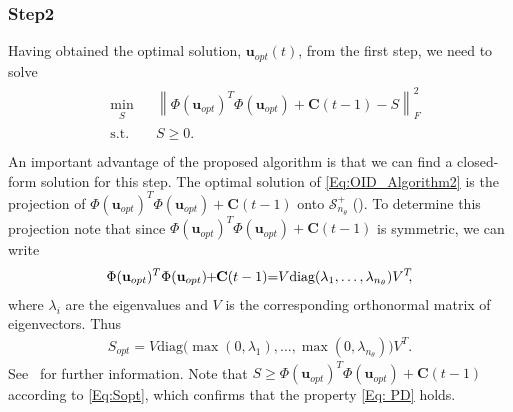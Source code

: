 \documentclass{ifacconf}
\begin{document}
\subsubsection{Step2}\label{Step2}
Having obtained the optimal solution, $\textbf{u}_{opt}(t)$, from the first step, we need to solve
\vspace{-0.2cm}
\begin{eqnarray} \label{Eq:OID_Algorithm2}
\begin{split}
&\min_{\substack {S}}
								&& \left \| \Phi(\textbf{u}_{opt})^T\Phi(\textbf{u}_{opt}) + \textbf{C}(t-1) - S  \right \|_F^2\\
&\text{s.t.}
			      		&& S \geq 0.\\
\end{split}
\end{eqnarray}
An important advantage of the proposed algorithm is that we can find a closed-form solution for this step. The optimal solution of \eqref{Eq:OID_Algorithm2} is the projection of $\Phi(\textbf{u}_{opt})^T\Phi(\textbf{u}_{opt}) + \textbf{C}(t-1)$ onto  $\mathcal{S}^+_{n_\theta}$ (\cite{ProjectionMethodsInConicOptimization2012}). To determine this projection note that since $\Phi(\textbf{u}_{opt})^T\Phi(\textbf{u}_{opt}) + \textbf{C}(t-1)$ is symmetric, we can write
\begin{align}\label{Eq:EigenValueDecomposition}
\Phi(\textbf{u}_{opt})^T\Phi(\textbf{u}_{opt}) \hspace{-0.1cm}+  \hspace{-0.1cm} \textbf{C}(t-1) \hspace{-0.1cm}=\hspace{-0.1cm} V \text{diag} (\lambda_1, \ldots, \lambda_{n_{\theta}}) V^T  \hspace{-0.1cm},
\end{align}
where $\lambda_i$ are the eigenvalues and $V$ is the corresponding orthonormal matrix of eigenvectors. Thus
\begin{align} \label{Eq:Sopt}
S_{opt}= V \text{diag} \big(\max(0,\lambda_1), \ldots, \max(0,\lambda_{n_{\theta}}) \big) V^T.
\end{align}
See~\cite{ProjectionMethodsInConicOptimization2012} for further information.
Note that $S \geq \Phi(\textbf{u}_{opt})^T\Phi(\textbf{u}_{opt}) + \textbf{C}(t-1)$ according to \eqref{Eq:Sopt}, which confirms that the property \eqref{Eq: PD} holds.
\end{document}
